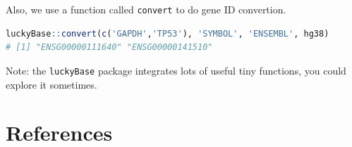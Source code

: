 \documentclass[
  12pt,
]{book}
\newcommand{\passthrough}[1]{#1}
\begin{document}
Also, we use a function called \passthrough{\lstinline!convert!} to do gene ID convertion.

\begin{lstlisting}[language=R]
luckyBase::convert(c('GAPDH','TP53'), 'SYMBOL', 'ENSEMBL', hg38)
# [1] "ENSG00000111640" "ENSG00000141510"
\end{lstlisting}

Note: the \passthrough{\lstinline!luckyBase!} package integrates lots of useful tiny functions, you could explore it sometimes.

\hypertarget{references}{%
\chapter*{References}\label{references}}
\end{document}
